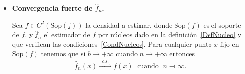 \begin{itemize}
	\item \textbf{Convergencia fuerte de $\widehat{f}_n$.} 

	\begin{theorem}
		\label{ConvFuerte_fn}
		Sea $f \in C^2(\mathrm{Sop}(f))$ la densidad a estimar, donde $\mathrm{Sop}(f)$ es el soporte de $f$, y $\widehat{f}_n$ el estimador  de $f$ por núcleos dado en la definición~\ref{DefNucleo} y que verifican las condiciones~\ref{CondNucleos}. Para cualquier punto $x$ fijo en $\mathrm{Sop}(f)$ tenemos que si $b \to +\infty$ cuando $n \to +\infty$ entonces
		\begin{align}
		\widehat{f}_n(x) \xrightarrow{\;\; c.s. \;\; }f(x) \; \text{ cuando } \; n \rightarrow \infty.
		\label{Consistenciac.s.} 
		\end{align}	
\end{theorem}





\end{itemize}
